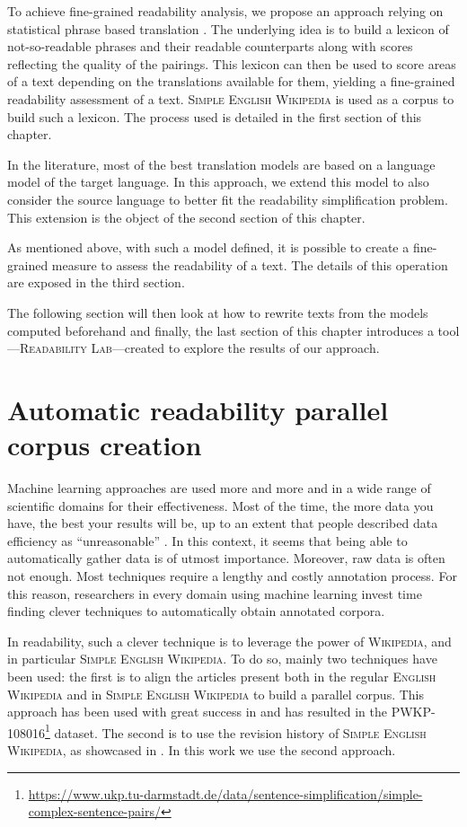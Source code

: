 \documentclass[a4paper, 11pt, onepage]{scrreprt}
\newcommand\wiki{\textsc{Wikipedia}}
\newcommand\ew{\textsc{English Wikipedia}}
\newcommand\sew{\textsc{Simple English Wikipedia}}
\begin{document}
To achieve fine-grained readability analysis, we propose an approach
relying on statistical phrase based translation
\cite{koehn2003statistical}. The underlying idea is to build a lexicon
of not-so-readable phrases and their readable counterparts along with
scores reflecting the quality of the pairings. This lexicon can then
be used to score areas of a text depending on the translations
available for them, yielding a fine-grained readability assessment of
a text. \sew{} is used as a corpus to build such a lexicon. The
process used is detailed in the first section of this chapter.

In the literature, most of the best translation models are based on a
language model of the target language. In this approach, we extend
this model to also consider the source language to better fit the
readability simplification problem. This extension is the object of
the second section of this chapter.

As mentioned above, with such a model defined, it is possible to
create a fine-grained measure to assess the readability of a text. The
details of this operation are exposed in the third section.

The following section will then look at how to rewrite texts from the
models computed beforehand and finally, the last section of this
chapter introduces a tool—\textsc{Readability Lab}—created to explore
the results of our approach.

\section{Automatic readability parallel corpus creation}
\label{sec:corpus}

Machine learning approaches are used more and more and in a wide range
of scientific domains for their effectiveness. Most of the time, the
more data you have, the best your results will be, up to an extent
that people described data efficiency as “unreasonable”
\cite{halevy2009unreasonable}. In this context, it seems that being
able to automatically gather data is of utmost importance. Moreover,
raw data is often not enough. Most techniques require a lengthy and
costly annotation process. For this reason, researchers in every
domain using machine learning invest time finding clever techniques to
automatically obtain annotated corpora.

In readability, such a clever technique is to leverage the power of
\wiki, and in particular \sew. To do so, mainly two techniques have
been used: the first is to align the articles present both in the
regular \ew{} and in \sew{} to build a parallel corpus. This approach
has been used with great success in \cite{zhu2010monolingual} and has
resulted in the
\textsc{PWKP-108016}\footnote{\url{https://www.ukp.tu-darmstadt.de/data/sentence-simplification/simple-complex-sentence-pairs/}}
dataset. The second is to use the revision history of \sew, as
showcased in \cite{yatskar2010sake}. In this work we use the second
approach.
\end{document}
